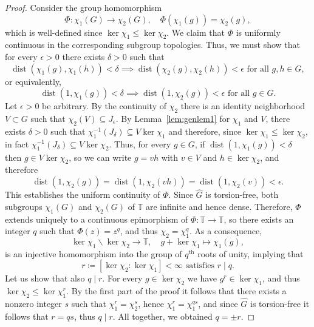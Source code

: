\documentclass{amsart}
\numberwithin{equation}{subsection}
\theoremstyle{remark}
\begin{document}
\begin{proof}
Consider the group homomorphism
\[\Phi:\chi_{1}\left(G\right)\longrightarrow\chi_{2}\left(G\right),\quad\Phi\left(\chi_{1}\left(g\right)\right)=\chi_{2}\left(g\right),\]
which is well-defined since \(\ker\chi_{1}\leq\ker\chi_{2}\). We claim that \(\Phi\) is uniformly continuous in the corresponding subgroup topologies. Thus, we must show that for every \(\epsilon>0\) there exists \(\delta>0\) such that
\[\operatorname{dist}\left(\chi_{1}\left(g\right),\chi_{1}\left(h\right)\right)<\delta\implies\operatorname{dist}\left(\chi_{2}\left(g\right),\chi_{2}\left(h\right)\right)<\epsilon\text{ for all }g,h\in G,\]
or equivalently,
\[\operatorname{dist}\left(1,\chi_{1}\left(g\right)\right)<\delta\implies\operatorname{dist}\left(1,\chi_{2}\left(g\right)\right)<\epsilon\text{ for all }g\in G.\]
Let \(\epsilon>0\) be arbitrary. By the continuity of \(\chi_{2}\) there is an identity neighborhood \(V\subset G\) such that \(\chi_{2}\left(V\right)\subseteq J_{\epsilon}\). By Lemma~\ref{lem:genlem1} for \(\chi_{1}\) and \(V\), there exists \(\delta>0\) such that \(\chi_{1}^{-1}\left(J_{\delta}\right)\subseteq V\ker\chi_{1}\) and therefore, since \(\ker\chi_{1}\leq\ker\chi_{2}\), in fact \(\chi_{1}^{-1}\left(J_{\delta}\right)\subseteq V\ker\chi_{2}\). Thus, for every \(g\in G\), if \(\operatorname{dist}\left(1,\chi_{1}\left(g\right)\right)<\delta\) then \(g\in V\ker\chi_{2}\), so we can write \(g=vh\) with \(v\in V\) and \(h\in\ker\chi_{2}\), and therefore
\[\operatorname{dist}\left(1,\chi_{2}\left(g\right)\right)=\operatorname{dist}\left(1,\chi_{2}\left(vh\right)\right)=\operatorname{dist}\left(1,\chi_{2}\left(v\right)\right)<\epsilon.\]
This establishes the uniform continuity of \(\Phi\). Since \(\widehat{G}\) is torsion-free, both subgroups \(\chi_{1}\left(G\right)\) and \(\chi_{2}\left(G\right)\) of \(\mathbb{T}\) are infinite and hence dense. Therefore, \(\Phi\) extends uniquely to a continuous epimorphism of \(\Phi:\mathbb{T}\to\mathbb{T}\), so there exists an integer \(q\) such that \(\Phi\left(z\right)=z^{q}\), and thus \(\chi_{2}=\chi_{1}^{q}\). As a consequence,
\[\ker\chi_{1}\backslash\ker\chi_{2}\to\mathbb{T},\quad g+\ker\chi_{1}\mapsto\chi_{1}\left(g\right),\]
is an injective homomorphism into the group of \(q^{\mathrm{th}}\) roots of unity, implying that
\[r\coloneqq\left[\ker\chi_{2}:\ker\chi_{1}\right]<\infty\text{ satisfies }r\mid q.\]
Let us show that also \(q\mid r\). For every \(g\in\ker\chi_{2}\) we have \(g^{r}\in\ker\chi_{1}\), and thus \(\ker\chi_{2}\leq\ker\chi_{1}^{r}\). By the first part of the proof it follows that there exists a nonzero integer \(s\) such that \(\chi_{1}^{r}=\chi_{2}^{s}\), hence \(\chi_{1}^{r}=\chi_{1}^{qs}\), and since \(\widehat{G}\) is torsion-free it follows that \(r=qs\), thus \(q\mid r\). All together, we obtained \(q=\pm r\).
\end{proof}
\end{document}
